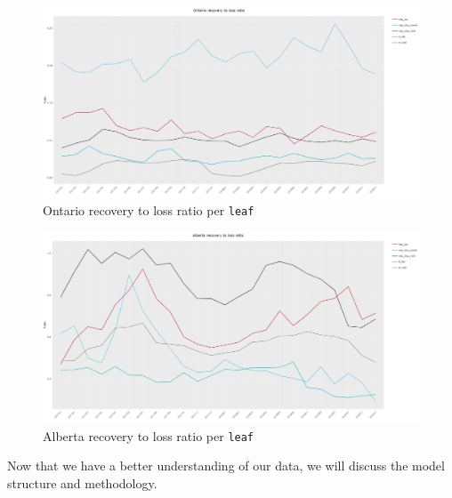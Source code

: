 	\begin{figure}[H]
		\begin{center}
			\includegraphics[scale=0.2]{Graphiques/ON_recovery_loss} 
			\renewcommand{\figurename}{Figure}
			\caption{Ontario recovery to loss ratio per \texttt{leaf}}\label{Fig_ON_recovery_loss}
		\end{center}
	\end{figure}
	
	\begin{figure}[H]
		\begin{center}
			\includegraphics[scale=0.2]{Graphiques/AB_recovery_loss} 
			\renewcommand{\figurename}{Figure}
			\caption{Alberta recovery to loss ratio per \texttt{leaf}}\label{Fig_AB_recovery_loss}
		\end{center}
	\end{figure}
	
	Now that we have a better understanding of our data, we will discuss the model structure and methodology.
	
	 